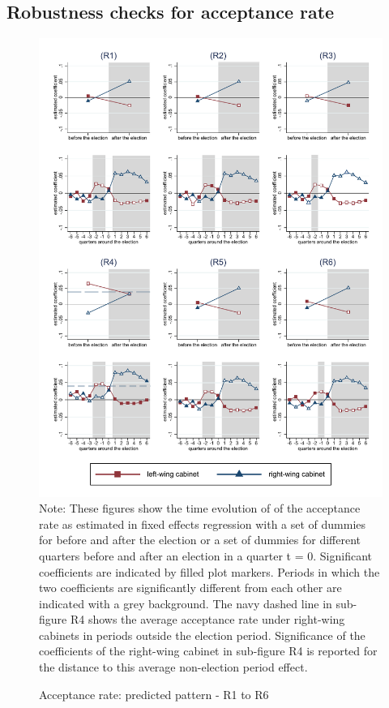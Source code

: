 \documentclass[11pt,a4paper]{scrartcl}
\begin{document}

\clearpage
\FloatBarrier
\subsection{Robustness checks for acceptance rate}



\clearpage
\FloatBarrier
\begin{figure}[!ht]
	\caption{Acceptance rate: predicted pattern - R1 to R6}
	\includegraphics[width=1\textwidth]{../results/decisions/acceptance_rate_graphs_R1-R6.pdf}
	\scriptsize{Note: These figures show the time evolution of of the acceptance rate as estimated in fixed effects regression with a set of dummies for before and after the election or a set of dummies for different quarters before and after an election in a quarter t = 0. Significant coefficients are indicated by filled plot markers. Periods in which the two coefficients are significantly different from each other are indicated with a grey background. The navy dashed line in sub-figure R4 shows the average acceptance rate under right-wing cabinets in periods outside the election period. Significance of the coefficients of the right-wing cabinet in sub-figure R4 is reported for the distance to this average non-election period effect.}
\end{figure}
\end{document}
